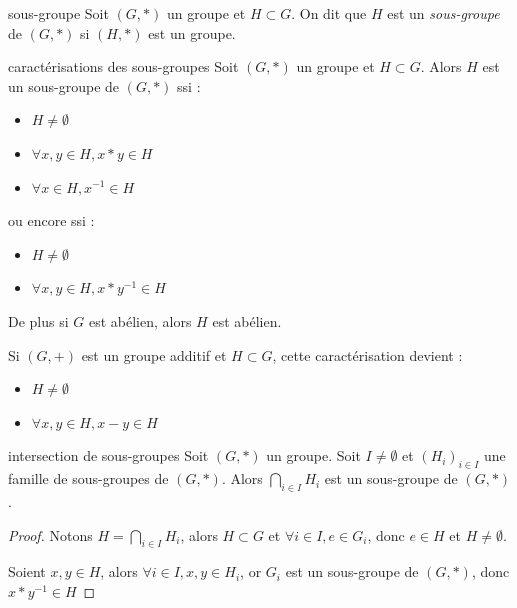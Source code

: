 \begin{definition}{sous-groupe}{}
    Soit $(G, \ast)$ un groupe et $H \subset G$. On dit que $H$ est un \emph{sous-groupe} de
    $(G, \ast)$ si $(H, \ast)$ est un groupe.
\end{definition}

\begin{proposition}{caractérisations des sous-groupes}{}
    Soit $(G, \ast)$ un groupe et $H \subset G$. 
    Alors $H$ est un sous-groupe de $(G, \ast)$ ssi :
    \begin{itemize}
        \item $H \neq \emptyset$
        \item $\forall x, y \in H, x \ast y \in H$ 
        \item $\forall x \in H, x^{-1} \in H$
    \end{itemize}
    ou encore ssi :
    \begin{itemize}
        \item $H \neq \emptyset$
        \item $\forall x, y \in H, x \ast y^{-1} \in H$
    \end{itemize}

    De plus si $G$ est abélien, alors $H$ est abélien.
\end{proposition}



\begin{remarque}
    Si $(G, +)$ est un groupe additif et $H \subset G$, cette caractérisation devient : 
    \begin{itemize}
        \item $H \neq \emptyset$
        \item $\forall x, y \in H, x - y \in H$
    \end{itemize}
\end{remarque}

\begin{theoreme}{intersection de sous-groupes}{}
    Soit $(G, \ast)$ un groupe. Soit $I \neq \emptyset$ et 
    $(H_i)_{i \in I}$ une famille de sous-groupes de $(G, \ast)$.
    Alors $\displaystyle \bigcap_{i \in I} H_i$ est un sous-groupe de $(G, \ast)$.
\end{theoreme}

\begin{proof}
    Notons $H = \bigcap_{i \in I} H_i$, alors $H \subset G$ 
    et $\forall i \in I, e \in G_i$, donc $e \in H$ et $H \neq \emptyset$.

    Soient $x, y \in H$, alors $\forall i \in I, x, y \in H_i$, or 
    $G_i$ est un sous-groupe de $(G, \ast)$, donc $x \ast y^{-1} \in H$
\end{proof}

